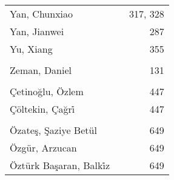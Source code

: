 \documentclass{easychair}
\begin{document}
\begin{longtable}{lp{10em}r}
\\
Yan, Chunxiao & & 317, 328 
\\
Yan, Jianwei & & 287 
\\
Yu, Xiang & & 355 
\\
\\
Zeman, Daniel & & 131 
\\
\\
\c{C}etino\u{g}lu, \"Ozlem & & 447 
\\
\c{C}\"oltekin, \c{C}a\u{g}r\.i & & 447 
\\
\\
\"Ozate\c{s}, \c{S}aziye Bet\"ul & & 649 
\\
\"Ozg\"ur, Arzucan & & 649 
\\
\"Ozt\"urk Ba\c{s}aran, Balk\.iz & & 649 
\end{longtable}
\end{document}
